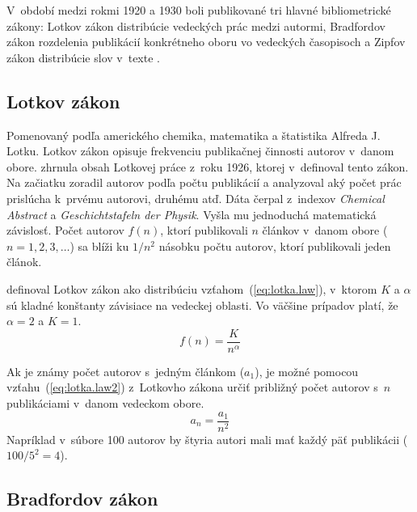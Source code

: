 V~období medzi rokmi 1920 a 1930 boli publikované tri hlavné bibliometrické
zákony: Lotkov zákon distribúcie vedeckých prác medzi autormi, Bradfordov zákon
rozdelenia publikácií konkrétneho oboru vo vedeckých časopisoch a Zipfov
zákon distribúcie
slov v~texte \citep{Bellis2009}.


\subsection{Lotkov zákon}

Pomenovaný podľa amerického chemika, matematika a štatistika Alfreda J.\,Lotku.
Lotkov zákon opisuje frekvenciu publikačnej činnosti autorov v~danom obore.
\citet{Ondrisova2011} zhrnula obsah Lotkovej práce z~roku 1926, ktorej
v~definoval tento zákon.  Na začiatku zoradil autorov podľa počtu publikácií a
analyzoval aký počet prác prislúcha k~prvému autorovi, druhému atď.  Dáta čerpal
z~indexov \emph{Chemical Abstract} a \emph{Geschichtstafeln der Physik}.  Vyšla
mu jednoduchá matematická závislosť.  Počet autorov $f(n)$, ktorí publikovali
$n$ článkov v~danom obore ($n = 1, 2, 3, \dots$) sa blíži ku $1/n^2$ násobku
počtu autorov, ktorí publikovali jeden článok.

\citet{Egghe2005} definoval Lotkov zákon ako distribúciu
vzťahom~(\ref{eq:lotka.law}), v~ktorom $K$ a $\alpha$ sú kladné konštanty
závisiace na vedeckej oblasti.  Vo väčšine prípadov platí, že $\alpha = 2$ a
$K = 1$.
\begin{equation}
\label{eq:lotka.law}
f(n) = \frac{K}{n^\alpha}
\end{equation}

Ak je známy počet autorov s~jedným článkom ($a_1$), je možné pomocou
vzťahu~(\ref{eq:lotka.law2}) z~Lotkovho zákona určiť približný počet autorov
s~$n$ publikáciami v~danom vedeckom obore.
\begin{equation}
\label{eq:lotka.law2}
a_n = \frac{a_1}{n^2}
\end{equation}
Napríklad v~súbore 100 autorov by štyria autori mali mať každý päť publikácii
($100/5^2 = 4$).


\subsection{Bradfordov zákon}


